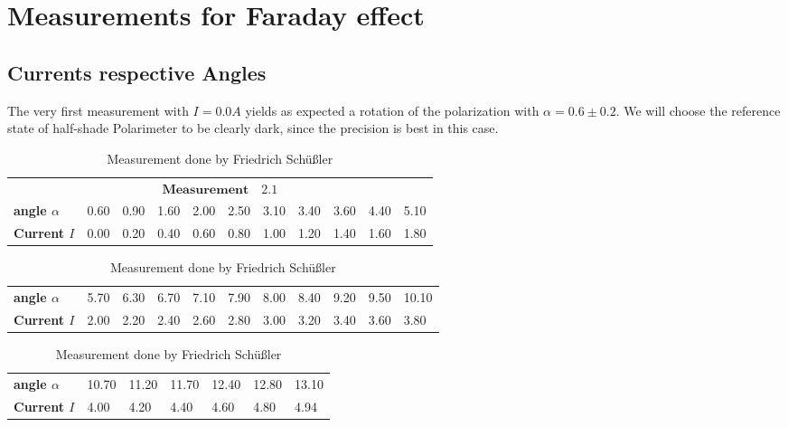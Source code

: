 \section{Measurements for Faraday effect}
\subsection{Currents respective Angles}
The very first measurement with $I=0.0A$ yields as expected a rotation of the polarization
with $\alpha = 0.6 \pm 0.2$. We will choose the reference state of half-shade Polarimeter 
to be clearly dark, since the precision is best in this case.



    \begin{table}[htdp]
        \begin{tabular}{|l||p{1.1cm}|p{1.1cm}|p{1.1cm}|p{1.1cm}|p{1.1cm}|p{1.1cm}|p{1.1cm}|p{1.1cm}|p{1.1cm}|p{1.1cm}|}
        \hline
            \multicolumn{11}{|c|}{\cellcolor[RGB]{206,250,201}$
            \mathbf{Measurement \quad 2.1}$} \\
\textbf{angle $\alpha$}& 0.60& 0.90& 1.60& 2.00& 2.50& 3.10& 3.40& 3.60& 4.40& 5.10 \\
\textbf{Current $I$}& 0.00& 0.20& 0.40& 0.60& 0.80& 1.00& 1.20& 1.40& 1.60& 1.80 \\

        \hline
        \end{tabular}
        \begin{tabular}{|l||p{1.1cm}|p{1.1cm}|p{1.1cm}|p{1.1cm}|p{1.1cm}|p{1.1cm}|p{1.1cm}|p{1.1cm}|p{1.1cm}|p{1.1cm}|}
        \hline\textbf{angle $\alpha$}& 5.70& 6.30& 6.70& 7.10& 7.90& 8.00& 8.40& 9.20& 9.50& 10.10 \\
\textbf{Current $I$}& 2.00& 2.20& 2.40& 2.60& 2.80& 3.00& 3.20& 3.40& 3.60& 3.80 \\

        \hline
        \end{tabular}
    \begin{tabular}{|l||p{1.1cm}|p{1.1cm}|p{1.1cm}|p{1.1cm}|p{1.1cm}|p{1.1cm}|}
    \hline\textbf{angle $\alpha$}& 10.70& 11.20& 11.70& 12.40& 12.80& 13.10 \\
\textbf{Current $I$}& 4.00& 4.20& 4.40& 4.60& 4.80& 4.94 \\

    \hline
    \end{tabular}
    \caption{Measurement done by Friedrich Schüßler}
    \label{Power05}
    \end{table}


